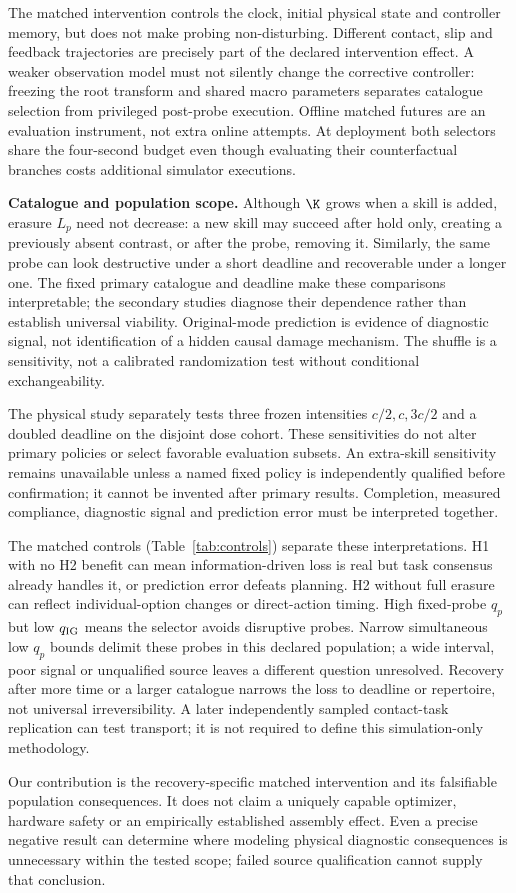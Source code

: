 The matched intervention controls the clock, initial physical state and controller memory, but does not make probing non-disturbing. Different contact, slip and feedback trajectories are precisely part of the declared intervention effect. A weaker observation model must not silently change the corrective controller: freezing the root transform and shared macro parameters separates catalogue selection from privileged post-probe execution. Offline matched futures are an evaluation instrument, not extra online attempts. At deployment both selectors share the four-second budget even though evaluating their counterfactual branches costs additional simulator executions.

\textbf{Catalogue and population scope.} Although $\K$ grows when a skill is added, erasure $L_p$ need not decrease: a new skill may succeed after hold only, creating a previously absent contrast, or after the probe, removing it. Similarly, the same probe can look destructive under a short deadline and recoverable under a longer one. The fixed primary catalogue and deadline make these comparisons interpretable; the secondary studies diagnose their dependence rather than establish universal viability. Original-mode prediction is evidence of diagnostic signal, not identification of a hidden causal damage mechanism. The shuffle is a sensitivity, not a calibrated randomization test without conditional exchangeability.

The physical study separately tests three frozen intensities $c/2,c, 3c/2$ and a doubled deadline on the disjoint dose cohort. These sensitivities do not alter primary policies or select favorable evaluation subsets. An extra-skill sensitivity remains unavailable unless a named fixed policy is independently qualified before confirmation; it cannot be invented after primary results. Completion, measured compliance, diagnostic signal and prediction error must be interpreted together.



The matched controls (Table~\ref{tab:controls}) separate these interpretations. H1 with no H2 benefit can mean information-driven loss is real but task consensus already handles it, or prediction error defeats planning. H2 without full erasure can reflect individual-option changes or direct-action timing. High fixed-probe $q_p$ but low $q_{\rm IG}$ means the selector avoids disruptive probes. Narrow simultaneous low $q_p$ bounds delimit these probes in this declared population; a wide interval, poor signal or unqualified source leaves a different question unresolved. Recovery after more time or a larger catalogue narrows the loss to deadline or repertoire, not universal irreversibility. A later independently sampled contact-task replication can test transport; it is not required to define this simulation-only methodology.

Our contribution is the recovery-specific matched intervention and its falsifiable population consequences. It does not claim a uniquely capable optimizer, hardware safety or an empirically established assembly effect. Even a precise negative result can determine where modeling physical diagnostic consequences is unnecessary within the tested scope; failed source qualification cannot supply that conclusion.
